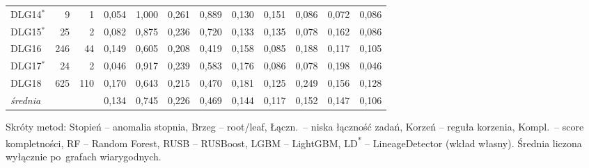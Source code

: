 \begin{table}[ht]
\begin{tabular}{lrrccccccccc}
DLG14$^{*}$ & 9 & 1 & 0{,}054 & 1{,}000 & 0{,}261 & 0{,}889 & 0{,}130 & 0{,}151 & 0{,}086 & 0{,}072 & 0{,}086 \\
DLG15$^{*}$ & 25 & 2 & 0{,}082 & 0{,}875 & 0{,}236 & 0{,}720 & 0{,}133 & 0{,}135 & 0{,}078 & 0{,}162 & 0{,}086 \\
DLG16 & 246 & 44 & 0{,}149 & 0{,}605 & 0{,}208 & 0{,}419 & 0{,}158 & 0{,}085 & 0{,}188 & 0{,}117 & 0{,}105 \\
DLG17$^{*}$ & 24 & 2 & 0{,}046 & 0{,}917 & 0{,}239 & 0{,}583 & 0{,}176 & 0{,}086 & 0{,}078 & 0{,}198 & 0{,}046 \\
DLG18 & 625 & 110 & 0{,}170 & 0{,}643 & 0{,}215 & 0{,}470 & 0{,}181 & 0{,}125 & 0{,}249 & 0{,}156 & 0{,}128 \\
\midrule
\emph{średnia} & & & 0{,}134 & 0{,}745 & 0{,}226 & 0{,}469 & 0{,}144 & 0{,}117 & 0{,}152 & 0{,}147 & 0{,}106 \\
\bottomrule
\end{tabular}

\vspace{0.4em}
\footnotesize Skróty metod: Stopień – anomalia stopnia, Brzeg – root/leaf, Łączn.\ – niska łączność zadań, Korzeń – reguła korzenia, Kompl.\ – score kompletności, RF – Random Forest, RUSB – RUSBoost, LGBM – LightGBM, LD\textsuperscript{*} – LineageDetector (wkład własny). Średnia liczona wyłącznie po~grafach wiarygodnych.
\end{table}